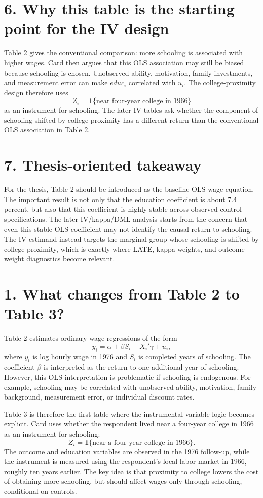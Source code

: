 \documentclass[11pt,a4paper]{article}
\begin{document}
\section*{6. Why this table is the starting point for the IV design}

Table 2 gives the conventional comparison: more schooling is associated with higher wages. Card then argues that this OLS association may still be biased because schooling is chosen. Unobserved ability, motivation, family investments, and measurement error can make \(educ_i\) correlated with \(u_i\). The college-proximity design therefore uses
\[
Z_i = \mathbf{1}\{\text{near four-year college in 1966}\}
\]
as an instrument for schooling. The later IV tables ask whether the component of schooling shifted by college proximity has a different return than the conventional OLS association in Table 2.

\section*{7. Thesis-oriented takeaway}

For the thesis, Table 2 should be introduced as the baseline OLS wage equation. The important result is not only that the education coefficient is about 7.4 percent, but also that this coefficient is highly stable across observed-control specifications. The later IV/kappa/DML analysis starts from the concern that even this stable OLS coefficient may not identify the causal return to schooling. The IV estimand instead targets the marginal group whose schooling is shifted by college proximity, which is exactly where LATE, kappa weights, and outcome-weight diagnostics become relevant.


\section*{1. What changes from Table 2 to Table 3?}

Table 2 estimates ordinary wage regressions of the form
\[
    y_i = \alpha + \beta S_i + X_i'\gamma + u_i,
\]
where \(y_i\) is log hourly wage in 1976 and \(S_i\) is completed years of schooling. 
The coefficient \(\beta\) is interpreted as the return to one additional year of schooling. 
However, this OLS interpretation is problematic if schooling is endogenous. For example, schooling may be correlated with unobserved ability, motivation, family background, measurement error, or individual discount rates.

Table 3 is therefore the first table where the instrumental variable logic becomes explicit. Card uses whether the respondent lived near a four-year college in 1966 as an instrument for schooling:
\[
    Z_i = \mathbf{1}\{\text{near a four-year college in 1966}\}.
\]
The outcome and education variables are observed in the 1976 follow-up, while the instrument is measured using the respondent's local labor market in 1966, roughly ten years earlier. The key idea is that proximity to college lowers the cost of obtaining more schooling, but should affect wages only through schooling, conditional on controls.
\end{document}
